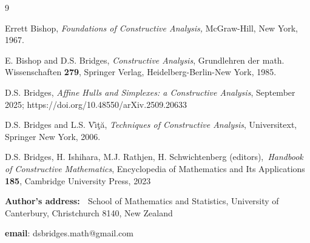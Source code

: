 \documentclass[11pt]{article}%
\begin{document}
\begin{thebibliography}{9}                                                                                                %


Errett Bishop, \emph{Foundations of Constructive Analysis,
}McGraw-Hill, New York, 1967.

E. Bishop and D.S. Bridges, \emph{Constructive Analysis},
Grundlehren der math. Wissenschaften \textbf{279}, Springer Verlag,
Heidelberg-Berlin-New York, 1985.

D.S. Bridges, \emph{Affine Hulls and Simplexes: a
Constructive Analysis}, September 2025; https://doi.org/10.48550/arXiv.2509.20633

D.S. Bridges and L.S. V\^{\i}\c{t}\u{a}, \emph{Techniques of
Constructive Analysis}, Universitext, Springer New York, 2006.

D.S. Bridges, H. Ishihara, M.J. Rathjen, H. Schwichtenberg
(editors),\emph{\ Handbook of Constructive Mathematics}, Encyclopedia of
Mathematics and Its Applications \textbf{185}, Cambridge University Press, 2023
\end{thebibliography}

%

\bigskip
%

\bigskip
%

\noindent
\textbf{Author's address: \ }School of Mathematics and Statistics, University
of Canterbury, Christchurch 8140, New Zealand%

\noindent
\textbf{email}: dsbridges.math@gmail.com
\end{document}
